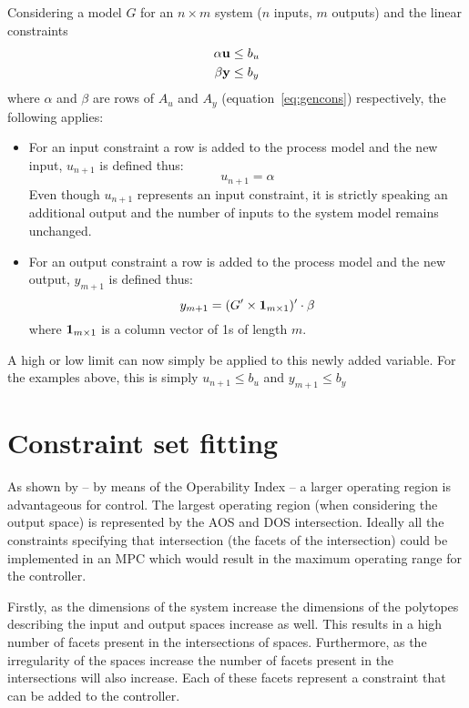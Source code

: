 Considering a model $G$ for an $n\times m$ system ($n$ inputs, $m$ outputs) and the linear constraints 
\begin{align}
  \alpha {\bf {u}} &\leq b_u\notag\\ 
  \beta {\bf {y}} &\leq b_y \notag   
\end{align}
where $\alpha$ and $\beta$ are rows of $A_u$ and $A_y$ (equation~\ref{eq:gencons}) respectively, the following applies:
\begin{itemize}
\item For an input constraint a row is added to the process model and the new input, $u_{n+1}$ is defined thus:
\begin{equation}
  \label{eq:linconinput}
   u_{n+1} = \alpha
\end{equation}
Even though $u_{n+1}$ represents an input constraint, it is strictly speaking an additional output and the number of inputs to the system model remains unchanged. 
\item For an output constraint a row is added to the process model and the new output, $y_{m+1}$ is defined thus:
\begin{equation}
  \label{eq:linconoutput}
   y_{m+1} = (G'\times{\bf {1}}_{m\times 1})'\cdot\beta
\end{equation}
where ${\bf {1}}_{m\times 1}$ is a column vector of 1s of length $m$.
\end{itemize}
A high or low limit can now simply be applied to this newly added variable.
For the examples above, this is simply $u_{n+1}\leq b_u$ and $y_{m+1}\leq b_y$


\section{Constraint set fitting}
As shown by \citet{vinsonphd} -- by means of the Operability Index -- a larger operating region is advantageous for control.
The largest operating region (when considering the output space) is represented by the AOS and DOS intersection.
Ideally all the constraints specifying that intersection (the facets of the intersection) could be implemented in an MPC which would result in the maximum operating range for the controller.

Firstly, as the dimensions of the system increase the dimensions of the polytopes describing the input and output spaces increase as well.
This results in a high number of facets present in the intersections of spaces.
Furthermore, as the irregularity of the spaces increase the number of facets present in the intersections will also increase.
Each of these facets represent a constraint that can be added to the controller.

